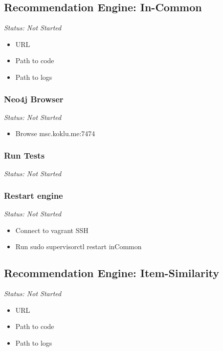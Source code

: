 \subsection{Recommendation Engine: In-Common}

\emph{Status: Not Started}

\begin{itemize}
\item URL
\item Path to code
\item Path to logs
\end{itemize}

\subsubsection{Neo4j Browser}

\emph{Status: Not Started}

\begin{itemize}
\item Browse msc.koklu.me:7474
\end{itemize}

\subsubsection{Run Tests}

\emph{Status: Not Started}

\subsubsection{Restart engine}

\emph{Status: Not Started}

\begin{itemize}
\item Connect to vagrant SSH
\item Run sudo supervisorctl restart inCommon
\end{itemize}


\subsection{Recommendation Engine: Item-Similarity}

\emph{Status: Not Started}

\begin{itemize}
\item URL
\item Path to code
\item Path to logs
\end{itemize}


